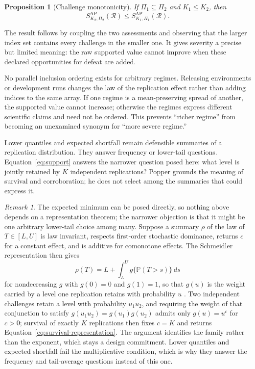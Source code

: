 \documentclass[11pt]{article}
\newcommand{\Regime}{\mathcal{R}}
\newcommand{\Prb}{\mathbb{P}}
\newtheorem{proposition}{Proposition}
\theoremstyle{remark}
\newtheorem*{remark}{Remark}
\begin{document}
\begin{proposition}[Challenge monotonicity]
\label{prop:monotonicity}
If $\Pi_1\subseteq\Pi_2$ and $K_1\leq K_2$, then
\[
S_{K_2,\Pi_2}^{\mathrm{AP}}(\Regime)
\leq
S_{K_1,\Pi_1}^{\mathrm{AP}}(\Regime).
\]
\end{proposition}

The result follows by coupling the two assessments and observing that the larger index set contains every challenge in the smaller one. It gives severity a precise but limited meaning: the raw supported value cannot improve when these declared opportunities for defeat are added.

No parallel inclusion ordering exists for arbitrary regimes. Releasing environments or development runs changes the law of the replication effect rather than adding indices to the same array. If one regime is a mean-preserving spread of another, the supported value cannot increase; otherwise the regimes express different scientific claims and need not be ordered. This prevents ``richer regime'' from becoming an unexamined synonym for ``more severe regime.''

Lower quantiles and expected shortfall remain defensible summaries of a replication distribution. They answer frequency or lower-tail questions. Equation~\eqref{eq:support} answers the narrower question posed here: what level is jointly retained by $K$ independent replications? Popper grounds the meaning of survival and corroboration; he does not select among the summaries that could express it.

\begin{remark}
The expected minimum can be posed directly, so nothing above depends on a representation theorem; the narrower objection is that it might be one arbitrary lower-tail choice among many. Suppose a summary $\rho$ of the law of $T\in[L,U]$ is law invariant, respects first-order stochastic dominance, returns $c$ for a constant effect, and is additive for comonotone effects. The Schmeidler representation then gives
\[
\rho(T)
=
L+\int_L^U g\{\Prb(T>s)\}\,ds
\]
for nondecreasing $g$ with $g(0)=0$ and $g(1)=1$, so that $g(u)$ is the weight carried by a level one replication retains with probability $u$ \cite{schmeidler1986integral,yaari1987dual}. Two independent challenges retain a level with probability $u_1u_2$, and requiring the weight of that conjunction to satisfy $g(u_1u_2)=g(u_1)g(u_2)$ admits only $g(u)=u^c$ for $c>0$; survival of exactly $K$ replications then fixes $c=K$ and returns Equation~\eqref{eq:survival-representation}. The argument identifies the family rather than the exponent, which stays a design commitment. Lower quantiles and expected shortfall fail the multiplicative condition, which is why they answer the frequency and tail-average questions instead of this one.
\end{remark}
\end{document}
